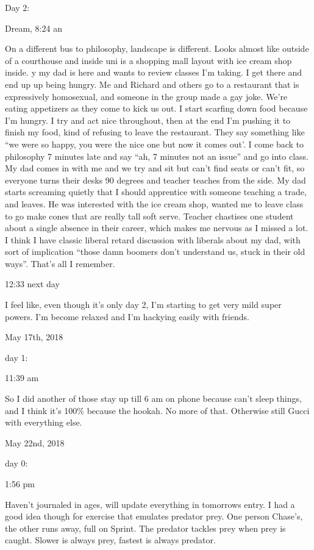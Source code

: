 Day 2:

Dream, 8:24 an

On a different bus to philosophy, landscape is different. Looks almost
like outside of a courthouse and inside uni is a shopping mall layout
with ice cream shop inside. y my dad is here and wants to review classes
I'm taking. I get there and end up up being hungry. Me and Richard and
others go to a restaurant that is expressively homosexual, and someone
in the group made a gay joke. We're eating appetizers as they come to
kick us out. I start scarfing down food because I'm hungry. I try and
act nice throughout, then at the end I'm pushing it to finish my food,
kind of refusing to leave the restaurant. They say something like ``we
were so happy, you were the nice one but now it comes out'. I come back
to philosophy 7 minutes late and say ``ah, 7 minutes not an issue'' and
go into class. My dad comes in with me and we try and sit but can't find
seats or can't fit, so everyone turns their desks 90 degrees and teacher
teaches from the side. My dad starts screaming quietly that I should
apprentice with someone teaching a trade, and leaves. He was interested
with the ice cream shop, wanted me to leave class to go make cones that
are really tall soft serve. Teacher chastises one student about a single
absence in their career, which makes me nervous as I missed a lot. I
think I have classic liberal retard discussion with liberals about my
dad, with sort of implication ``those damn boomers don't understand us,
stuck in their old ways''. That's all I remember.

12:33 next day

I feel like, even though it's only day 2, I'm starting to get very mild
super powers. I'm become relaxed and I'm hackying easily with friends.

\bigskip
\bigskip
May 17th, 2018

day 1:

11:39 am

So I did another of those stay up till 6 am on phone because can't sleep
things, and I think it's 100\% because the hookah. No more of that.
Otherwise still Gucci with everything else.

\bigskip
\bigskip
May 22nd, 2018

day 0:

1:56 pm

Haven't journaled in ages, will update everything in tomorrows entry. I
had a good idea though for exercise that emulates predator prey. One
person Chase's, the other runs away, full on Sprint. The predator
tackles prey when prey is caught. Slower is always prey, fastest is
always predator.

